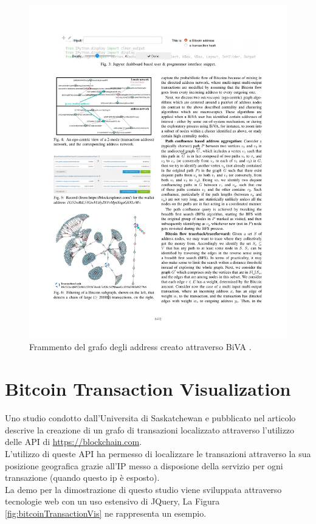 \begin{figure}
\centering
\includegraphics[scale=1.0]{images/bivaGraph.pdf}
\caption{Frammento del grafo degli address creato attraverso BiVA \cite{DBLP:conf/icdm/OggierPD18}.\label{fig:bivaGraph}}
\end{figure}


\section{Bitcoin Transaction Visualization} \label{sec:bitcoinTransactionVis}

Uno studio condotto dall'Universita di Saskatchewan e pubblicato nel articolo \cite{BitcoinBlockchainTransactionsVisualization:article} descrive la creazione di un grafo di transazioni localizzato attraverso l'utilizzo delle API di \url{https://blockchain.com}.\\
L'utilizzo di queste API ha permesso di localizzare le transazioni attraverso la sua posizione geografica grazie all'IP messo a disposione della servizio per ogni transazione (quando questo ip è esposto).\\
La demo per la dimostrazione di questo studio viene sviluppata attraverso tecnologie web con un uso estensivo di JQuery, La Figura \ref{fig:bitcoinTransactionVis} ne rappresenta un esempio.


